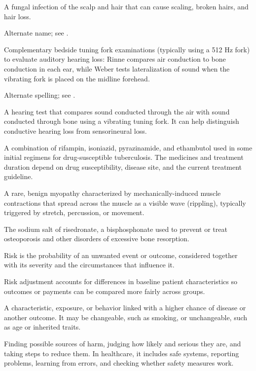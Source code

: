  A fungal infection of the scalp and hair that can cause scaling, broken hairs, and hair loss.

 Alternate name; see .

 Complementary bedside tuning fork examinations (typically using a 512 Hz fork) to evaluate auditory hearing loss: Rinne compares air conduction to bone conduction in each ear, while Weber tests lateralization of sound when the vibrating fork is placed on the midline forehead.

 Alternate spelling; see .

 A hearing test that compares sound conducted through the air with sound conducted through bone using a vibrating tuning fork. It can help distinguish conductive hearing loss from sensorineural loss.

 A combination of rifampin, isoniazid, pyrazinamide, and ethambutol used in some initial regimens for drug-susceptible tuberculosis. The medicines and treatment duration depend on drug susceptibility, disease site, and the current treatment guideline.

 A rare, benign myopathy characterized by mechanically-induced muscle contractions that
spread across the muscle as a visible wave (rippling), typically triggered by stretch,
percussion, or movement.

 The sodium salt of risedronate, a bisphosphonate used to prevent or treat osteoporosis and other disorders of excessive bone resorption.

 Risk is the probability of an unwanted event or outcome, considered together with its severity and the circumstances that influence it.

 Risk adjustment accounts for differences in baseline patient characteristics so outcomes or payments can be compared more fairly across groups.

 A characteristic, exposure, or behavior linked with a higher chance of disease or another outcome. It may be changeable, such as smoking, or unchangeable, such as age or inherited traits.

 Finding possible sources of harm, judging how likely and serious they are, and taking steps to reduce them. In healthcare, it includes safe systems, reporting problems, learning from errors, and checking whether safety measures work.

